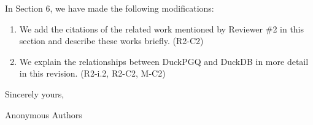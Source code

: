 \documentclass{article}
\begin{document}
In Section 6, we have made the following modifications:
\begin{enumerate}
	\item We add the citations of the related work mentioned by Reviewer \#2 in this section and describe these works briefly. (R2-C2)
	\item We explain the relationships between DuckPGQ and DuckDB in more detail in this revision. (R2-i.2, R2-C2, M-C2)
\end{enumerate}



\bigskip %

Sincerely yours,

\vspace{20pt} %

Anonymous Authors
\end{document}
